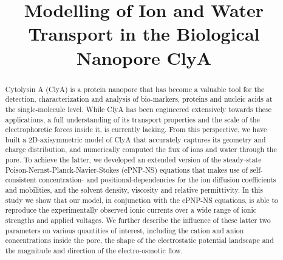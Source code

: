 \documentclass[journal=ancac3,manuscript=article,etalmode=truncate,maxauthors=0,layout=twocolumn]{achemso}
\title{Modelling of Ion and Water Transport in the Biological Nanopore ClyA}
\begin{document}
\begin{tocentry}
\end{tocentry}

\begin{abstract}
\footnotesize
Cytolysin A (ClyA) is a protein nanopore that has become a valuable tool for the detection, characterization
and analysis of bio-markers, proteins and nucleic acids at the single-molecule level.  While ClyA has been
engineered extensively towards these applications, a full understanding of its transport properties and the
scale of the electrophoretic forces inside it, is currently lacking. From this perspective, we have built a
2D-axisymmetric model of ClyA that accurately captures its geometry and charge distribution, and numerically
computed the flux of ions and water through the pore. To achieve the latter, we developed an extended version
of the steady-state Poison-Nernst-Planck-Navier-Stokes (ePNP-NS) equations that makes use of self-consistent
concentration- and positional-dependencies for the ion diffusion coefficients and mobilities, and the solvent
density, viscosity and relative permittivity. In this study we show that our model, in conjunction with the
ePNP-NS equations, is able to reproduce the experimentally observed ionic currents over a wide range of ionic
strengths and applied voltages. We further describe the influence of these latter two parameters on various
quantities of interest, including the cation and anion concentrations inside the pore, the shape of the
electrostatic potential landscape and the magnitude and direction of the electro-osmotic flow.
\end{abstract}


\end{document}
